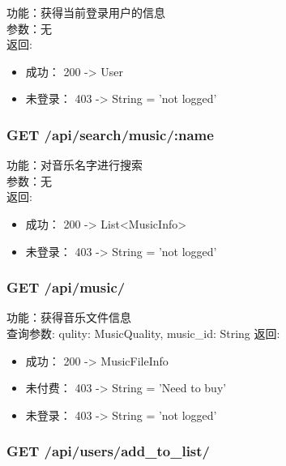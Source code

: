 \noindent
功能：获得当前登录用户的信息\\
参数：无\\
返回:
\begin{itemize}
	\item 成功： 200 -> User
	\item 未登录： 403 -> String = 'not logged'
\end{itemize}


\subsubsection{GET /api/search/music/:name}

\noindent
功能：对音乐名字进行搜索\\
参数：无\\
返回:
\begin{itemize}
	\item 成功： 200 -> List<MusicInfo>
	\item 未登录： 403 -> String = 'not logged'
\end{itemize}


\subsubsection{GET /api/music/}

\noindent
功能：获得音乐文件信息\\
查询参数: qulity: MusicQuality, music\_id: String
返回:
\begin{itemize}
	\item 成功： 200 -> MusicFileInfo
	\item 未付费： 403 -> String = 'Need to buy'
	\item 未登录： 403 -> String = 'not logged'
\end{itemize}


\subsubsection{GET /api/users/add\_to\_list/}

